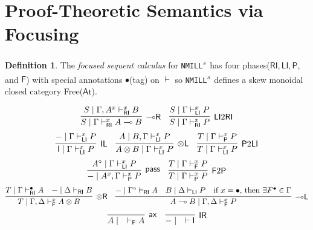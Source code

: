 \documentclass[submission,copyright,creativecommons]{eptcs}
\theoremstyle{definition}
\newtheorem{defn}{Definition}[section]
\newcommand{\tl}{\otimes \mathsf{L}}
\newcommand{\tr}{\otimes \mathsf{R}}
\newcommand{\lright}{{\multimap}\mathsf{R}}
\newcommand{\lleft}{{\multimap}\mathsf{L}}
\newcommand{\pass}{\mathsf{pass}}
\newcommand{\unitl}{\mathsf{IL}}
\newcommand{\unitr}{\mathsf{IR}}
\newcommand{\ax}{\mathsf{ax}}
\newcommand{\ot}{\otimes}
\newcommand{\lolli}{\multimap}
\newcommand{\I}{\mathsf{I}}
\newcommand{\RI}{\mathsf{RI}}
\newcommand{\LI}{\mathsf{LI}}
\newcommand{\Pass}{\mathsf{P}}
\newcommand{\F}{\mathsf{F}}
\newcommand{\xvdash}{\vdash^{x}}
\newcommand{\NMILL}{\texttt{NMILL}}
\newcommand{\SkNMILL}{\NMILL\textsuperscript{\textit{s}}}
\newcommand{\FSkMCC}{\textsf{Free}}
\begin{document}

\section{Proof-Theoretic Semantics via Focusing}
\begin{defn}
  The \emph{focused sequent calculus} for \SkNMILL\ has four phases($\RI , \LI , \Pass$, and $\F$) with  special annotations $\bullet$(tag) on $\vdash$ so \SkNMILL\ defines a skew monoidal closed category \FSkMCC($\mathsf{At}$).

  \begin{displaymath}
    \infer[\lright]{S \mid \Gamma \vdash^{x}_{\RI} A \lolli B}{S \mid \Gamma , A^{x} \vdash^{x}_{\RI} B}
    \quad
    \infer[\LI 2 \RI]{S \mid \Gamma \vdash^{x}_{\RI} P}{S \mid \Gamma \vdash^{x}_{\LI} P}
  \end{displaymath}
  \begin{displaymath}
    \infer[\unitl]{\I \mid \Gamma \xvdash_{\LI} P}{- \mid \Gamma \xvdash_{\LI} P}
    \quad
    \infer[\tl]{A \ot B \mid \Gamma \xvdash_{\LI} P}{A \mid B , \Gamma \xvdash_{\LI} P}
    \quad
    \infer[\Pass 2 \LI]{T \mid \Gamma \xvdash_{\LI} P}{T \mid \Gamma \xvdash_{\Pass} P}
  \end{displaymath}
  \begin{displaymath}
    \infer[\pass]{- \mid A^{x} , \Gamma \xvdash_{\Pass} P }{A^{\circ} \mid \Gamma \xvdash_{\LI} P}
    \quad
    \infer[\F 2 \Pass]{T \mid \Gamma \xvdash_{\Pass} P}{T \mid \Gamma \xvdash_{\F} P}
  \end{displaymath}
  \begin{displaymath}
    \infer[\tr]{T \mid \Gamma , \Delta \xvdash_{\F} A \ot B}{
      T \mid \Gamma \vdash^{\bullet}_{\RI} A
      &
      - \mid \Delta \vdash_{\RI} B
    }
    \quad
    \infer[\lleft]{A \lolli B \mid \Gamma , \Delta \xvdash_{\F} P}{
      - \mid \Gamma^{\circ} \vdash_{\RI} A
      &
      B \mid \Delta \vdash_{\LI} P
      &
      \text{if } x = \bullet \text{, then } \exists F^{\bullet} \in \Gamma
    }
  \end{displaymath}
  \begin{displaymath}
    \infer[\ax]{A \mid \quad \vdash_{\F} A}{}
    \quad
    \infer[\unitr]{- \mid \quad \vdash \I}{}
  \end{displaymath}
\end{defn}
\end{document}

